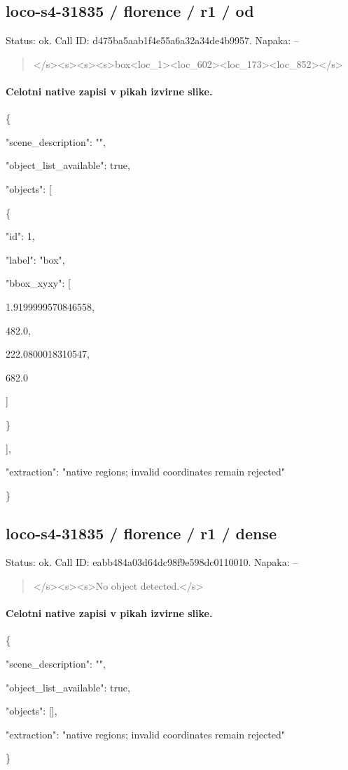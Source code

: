 \documentclass[10pt,a4paper]{article}
\begin{document}
\subsection*{loco-s4-31835 / florence / r1 / od}
Status: ok. Call ID: d475ba5aab1f4e55a6a32a34de4b9957. Napaka: --
\begin{quote}\footnotesize
</s>\allowbreak{}<s>\allowbreak{}<s>\allowbreak{}<s>\allowbreak{}box<loc\_1>\allowbreak{}<loc\_602>\allowbreak{}\allowbreak{}<loc\_173>\allowbreak{}<loc\_852>\allowbreak{}</s>\allowbreak{}
\end{quote}
\paragraph{Celotni native zapisi v pikah izvirne slike.}
\{\par
  "scene\_description":\allowbreak{} "",\allowbreak{}\par
  "object\_list\_available":\allowbreak{} true,\allowbreak{}\par
  "objects":\allowbreak{} [\par
    \{\par
      "id":\allowbreak{} 1,\allowbreak{}\par
      "label":\allowbreak{} "box",\allowbreak{}\par
      "bbox\_xyxy":\allowbreak{} [\par
        1.9199999570846558,\allowbreak{}\par
        482.0,\allowbreak{}\par
        222.0800018310547,\allowbreak{}\par
        682.0\par
      ]\par
    \}\par
  ],\allowbreak{}\par
  "extraction":\allowbreak{} "native regions; invalid coordinates remain rejected"\par
\}
\subsection*{loco-s4-31835 / florence / r1 / dense}
Status: ok. Call ID: eabb484a03d64dc98f9e598dc0110010. Napaka: --
\begin{quote}\footnotesize
</s>\allowbreak{}<s>\allowbreak{}<s>\allowbreak{}No object detected.</s>\allowbreak{}
\end{quote}
\paragraph{Celotni native zapisi v pikah izvirne slike.}
\{\par
  "scene\_description":\allowbreak{} "",\allowbreak{}\par
  "object\_list\_available":\allowbreak{} true,\allowbreak{}\par
  "objects":\allowbreak{} [],\allowbreak{}\par
  "extraction":\allowbreak{} "native regions; invalid coordinates remain rejected"\par
\}
\end{document}
